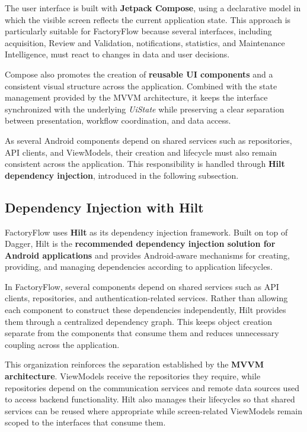 The user interface is built with \textbf{Jetpack Compose}, using a declarative model in which the visible screen reflects the current application state. This approach is particularly suitable for FactoryFlow because several interfaces, including acquisition, Review and Validation, notifications, statistics, and Maintenance Intelligence, must react to changes in data and user decisions.

Compose also promotes the creation of \textbf{reusable UI components} and a consistent visual structure across the application. Combined with the state management provided by the MVVM architecture, it keeps the interface synchronized with the underlying \textit{UiState} while preserving a clear separation between presentation, workflow coordination, and data access.

As several Android components depend on shared services such as repositories, API clients, and ViewModels, their creation and lifecycle must also remain consistent across the application. This responsibility is handled through \textbf{Hilt dependency injection}, introduced in the following subsection.

\subsection{Dependency Injection with Hilt}
\label{subsec:android-hilt}

FactoryFlow uses \textbf{Hilt} as its dependency injection framework. Built on top of Dagger, Hilt is the \textbf{recommended dependency injection solution for Android applications} and provides Android-aware mechanisms for creating, providing, and managing dependencies according to application lifecycles.

In FactoryFlow, several components depend on shared services such as API clients, repositories, and authentication-related services. Rather than allowing each component to construct these dependencies independently, Hilt provides them through a centralized dependency graph. This keeps object creation separate from the components that consume them and reduces unnecessary coupling across the application.

This organization reinforces the separation established by the \textbf{MVVM architecture}. ViewModels receive the repositories they require, while repositories depend on the communication services and remote data sources used to access backend functionality. Hilt also manages their lifecycles so that shared services can be reused where appropriate while screen-related ViewModels remain scoped to the interfaces that consume them.

